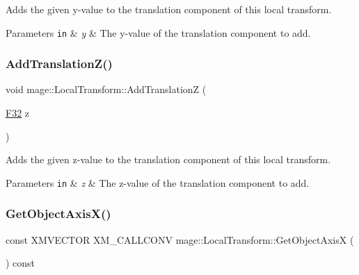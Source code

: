 Adds the given y-\/value to the translation component of this local transform.


\begin{DoxyParams}[1]{Parameters}
\mbox{\tt in}  & {\em y} & The y-\/value of the translation component to add. \\
\hline
\end{DoxyParams}
\mbox{\label{classmage_1_1_local_transform_aa2f35831d30101a57d1bfaf1cba527b8}} 
\subsubsection{\texorpdfstring{Add\+Translation\+Z()}{AddTranslationZ()}}
{\footnotesize\ttfamily void mage\+::\+Local\+Transform\+::\+Add\+TranslationZ (\begin{DoxyParamCaption}\item[{\mbox{\hyperlink{namespacemage_aa97e833b45f06d60a0a9c4fc22ae02c0}{F32}}}]{z }\end{DoxyParamCaption})\hspace{0.3cm}{\ttfamily [noexcept]}}

Adds the given z-\/value to the translation component of this local transform.


\begin{DoxyParams}[1]{Parameters}
\mbox{\tt in}  & {\em z} & The z-\/value of the translation component to add. \\
\hline
\end{DoxyParams}
\mbox{\label{classmage_1_1_local_transform_a369350f17dbf41afa8278643bb641125}} 
\subsubsection{\texorpdfstring{Get\+Object\+Axis\+X()}{GetObjectAxisX()}}
{\footnotesize\ttfamily const X\+M\+V\+E\+C\+T\+OR X\+M\+\_\+\+C\+A\+L\+L\+C\+O\+NV mage\+::\+Local\+Transform\+::\+Get\+Object\+AxisX (\begin{DoxyParamCaption}{ }\end{DoxyParamCaption}) const\hspace{0.3cm}{\ttfamily [noexcept]}}

